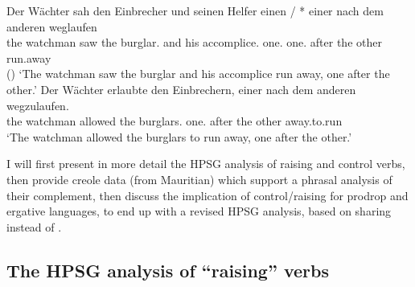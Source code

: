 \eal
\label{german2}
\ex 
\gll Der Wächter  sah den Einbrecher     und seinen Helfer            einen       / *  einer nach dem anderen weglaufen\\
     the watchman saw the burglar.\ACC{} and his    accomplice.\ACC{} one.\ACC{} {} {} one.\NOM{} after the other run.away\\\hfill()
\glt `The watchman saw the burglar and his accomplice run away, one after the other.'
\ex
\gll Der Wächter erlaubte den Einbrechern, einer nach dem anderen wegzulaufen.\\
     the watchman  allowed the burglars.\DAT{} one.\NOM{} after the other away.to.run\\
\glt `The watchman allowed the burglars to run away, one after the other.'
\zl

I will first present in more detail the HPSG analysis of raising and
control verbs, then provide creole data (from Mauritian) which support a phrasal analysis of their
complement, then discuss the implication of control/raising for prodrop and ergative languages, to end up
with a revised HPSG analysis, based on sharing \xarg instead of \subj. 

\subsection{The HPSG analysis of ``raising'' verbs}
\label{control:sec-HPSG-anaylsis-of-raising}

